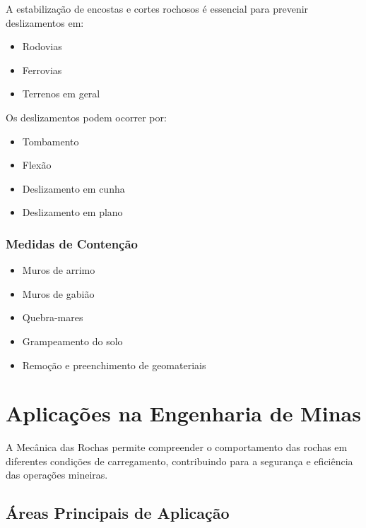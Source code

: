 \documentclass[12pt,a4paper,twoside]{book}
\begin{document}
A estabilização de encostas e cortes rochosos é essencial para prevenir deslizamentos em:
\begin{itemize}
    \item Rodovias
    \item Ferrovias
    \item Terrenos em geral
\end{itemize}

Os deslizamentos podem ocorrer por:
\begin{itemize}
    \item Tombamento
    \item Flexão
    \item Deslizamento em cunha
    \item Deslizamento em plano
\end{itemize}

\subsubsection{Medidas de Contenção}

\begin{itemize}
    \item Muros de arrimo
    \item Muros de gabião
    \item Quebra-mares
    \item Grampeamento do solo
    \item Remoção e preenchimento de geomateriais
\end{itemize}

\section{Aplicações na Engenharia de Minas}

A Mecânica das Rochas permite compreender o comportamento das rochas em diferentes condições de 
carregamento, contribuindo para a segurança e eficiência das operações mineiras.

\subsection{Áreas Principais de Aplicação}
\end{document}

